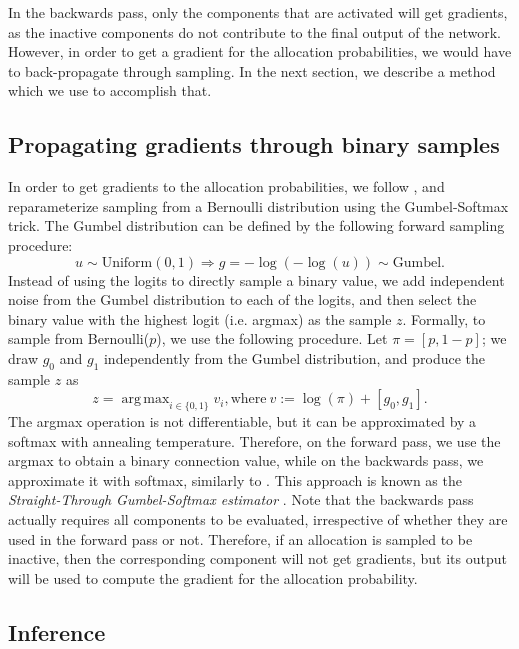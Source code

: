 \documentclass[conference]{IEEEtran}
\DeclareMathOperator*{\argmax}{arg\,max}
\begin{document}
In the backwards pass, only the components that are activated will get gradients, as the inactive components do not contribute to the final output of the network. However, in order to get a gradient for the allocation probabilities, we would have to back-propagate through sampling. In the next section, we describe a method which we use to accomplish that.

\subsection{Propagating gradients through binary samples}
In order to get gradients to the allocation probabilities, we follow \cite{JangGuPoole.2017}, and reparameterize sampling from a Bernoulli distribution using the Gumbel-Softmax trick.
The Gumbel distribution can be defined by the following forward sampling procedure:
\begin{equation*} 
u \sim \text{Uniform}(0, 1) \Rightarrow g = -\log(-\log(u)) \sim \text{Gumbel}.
\end{equation*}
Instead of using the logits to directly sample a binary value, we add independent noise from the Gumbel distribution to each of the logits, and then select the binary value with the highest logit (i.e. argmax) as the sample $z$. Formally, to sample from Bernoulli($p$), we use the following procedure. Let $\pi = [p, 1 - p]$; we draw $g_0$ and $g_1$ independently from the Gumbel distribution, and produce the sample $z$ as
\begin{equation*}
z = \argmax_{i \in \{0,1\}} v_i, \text{where}   ~v:=  \log(\pi) + [g_0, g_1].
\end{equation*}
The argmax operation is not differentiable, but it can be approximated by a softmax with annealing temperature. Therefore, on the forward pass, we use the argmax to obtain a binary connection value, while on the backwards pass, we approximate it with softmax, similarly to \cite{SpotTune-CVPR-2018}. This approach is known as the \textit{Straight-Through Gumbel-Softmax estimator} \cite{JangGuPoole.2017}.
Note that the backwards pass actually requires all components to be evaluated, irrespective of whether they are used in the forward pass or not. Therefore, if an allocation is sampled to be inactive, then the corresponding component will not get gradients, but its output will be used to compute the gradient for the allocation probability.

\subsection{Inference}
\end{document}
